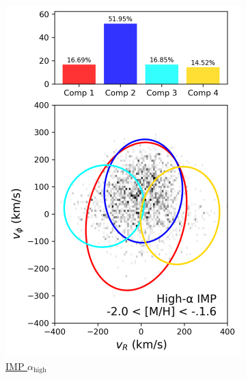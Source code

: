 \documentclass[a4paper,10pt]{article}
\begin{document}
\begin{multicols}{2}
\begin{figure}[H]
\begin{subfigure}[t]{0.24\linewidth}
    \includegraphics[width=\linewidth]{../figures/gmm_imp_high_alpha_k4.png}
    \caption{\href{https://raw.githack.com/raunaq-rai/Disentangling-the-Milky-Way-using-GMM/main/figures/IMP\_high\_\_\_-2\%5BM\_H\%5D-1.6.html}{IMP $\alpha_{\mathrm{high}}$}}
    \label{fig:imp_hi}
  \end{subfigure}\hfill
  \begin{subfigure}[t]{0.24\linewidth}

\end{subfigure}
\end{figure}
\end{multicols}
\end{document}
